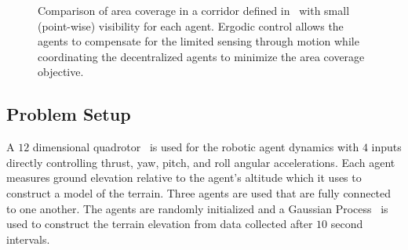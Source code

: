 \documentclass[letterpaper, 10 pt, conference]{ieeeconf}  %
\begin{document}
\begin{figure}[thpb]
\centering
{}
\caption{
Comparison of area coverage in a corridor defined in~\cite{kantaros2015distributed} with small (point-wise) visibility for each agent. 
Ergodic control allows the agents to compensate for the limited sensing through motion while coordinating the decentralized agents to minimize the area coverage objective.
}
\label{fig:corridor_comparison}
\end{figure}

\subsection{Problem Setup}
A $12$ dimensional quadrotor~\cite{martin2010true} is used for the robotic agent dynamics with $4$ inputs directly controlling thrust, yaw, pitch, and roll angular accelerations.
Each agent measures ground elevation relative to the agent's altitude which it uses to construct a model of the terrain.
Three agents are used that are fully connected to one another.
The agents are randomly initialized and a Gaussian Process~\cite{vasudevan2009gaussian, plagemann2008learning} is used to construct the terrain elevation from data collected after $10$ second intervals.
\end{document}
